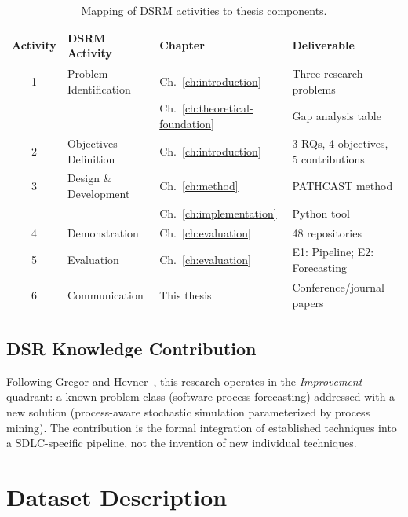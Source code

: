 \begin{table}[htbp]
\centering
\caption{Mapping of DSRM activities to thesis components.}
\label{tab:dsrm-mapping}
\small
\begin{tabular}{clll}
\toprule
\textbf{Activity} & \textbf{DSRM Activity} & \textbf{Chapter} & \textbf{Deliverable} \\
\midrule
1 & Problem Identification & Ch.~\ref{ch:introduction} & Three research problems \\
  &                        & Ch.~\ref{ch:theoretical-foundation} & Gap analysis table \\
\midrule
2 & Objectives Definition  & Ch.~\ref{ch:introduction} & 3 RQs, 4 objectives, 5 contributions \\
\midrule
3 & Design \& Development  & Ch.~\ref{ch:method}        & PATHCAST method \\
  &                        & Ch.~\ref{ch:implementation} & Python tool \\
\midrule
4 & Demonstration          & Ch.~\ref{ch:evaluation}    & 48 repositories \\
\midrule
5 & Evaluation             & Ch.~\ref{ch:evaluation}    & E1: Pipeline; E2: Forecasting \\
\midrule
6 & Communication          & This thesis                & Conference/journal papers \\
\bottomrule
\end{tabular}
\end{table}


\subsection{DSR Knowledge Contribution}
\label{sec:dsr-contribution}

Following Gregor and Hevner~\cite{gregor2013positioning}, this research
operates in the \emph{Improvement} quadrant: a known problem class
(software process forecasting) addressed with a new solution
(process-aware stochastic simulation parameterized by process mining).
The contribution is the formal integration of established techniques
into a SDLC-specific pipeline, not the invention of new individual
techniques.


\section{Dataset Description}
\label{sec:dataset}

